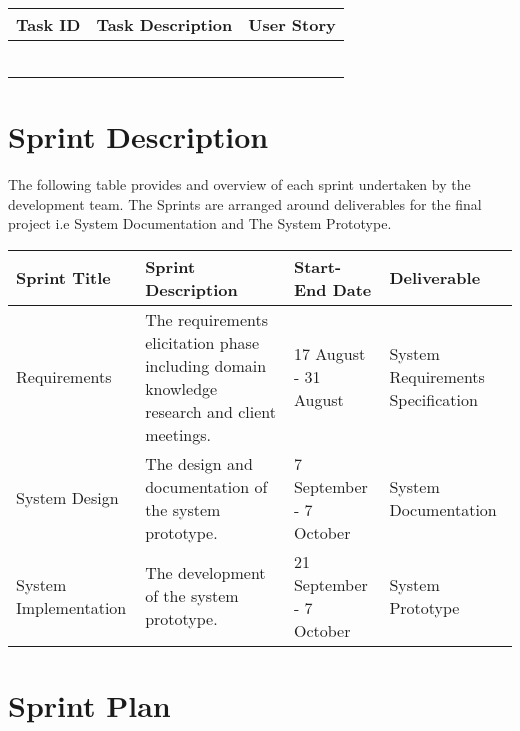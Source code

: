 \documentclass[11pt]{article}
\begin{document}
\begin{table}[H]
	\begin{tabular}{@{}|l|l|l|@{}}
		\toprule
		Task ID & Task Description & User Story \\ \midrule
				&           &     \\ \midrule
				&           &     \\ \midrule
				&           &     \\ \midrule
				&           &     \\ \midrule
				&           &     \\ \midrule
		
				&           &     \\ \bottomrule
	\end{tabular}
\end{table}

\section{Sprint Description}
The following table provides and overview of each sprint undertaken by the development team. The Sprints are arranged around deliverables for the final project i.e System Documentation and The System Prototype.
\begin{table}[H]
	\hskip-4.0cm\begin{tabular}[\textwidth]{@{}|l|l|l|l|@{}}
		\toprule
		Sprint Title & Sprint Description & Start-End Date & Deliverable \\ \midrule
		Requirements & \begin{minipage}{0.3\textwidth}
		The requirements elicitation phase including domain knowledge research and client meetings.
		\end{minipage} & 17 August - 31 August & System Requirements Specification \\ \midrule
	System Design	&  \begin{minipage}{0.3\textwidth}
		The design and documentation of the system prototype.
	\end{minipage} & 7 September - 7 October & System Documentation\\ \midrule
	System Implementation  &\begin{minipage}{0.3\textwidth}
		The development of the system prototype.
	\end{minipage}  & 21 September - 7 October & System Prototype\\ \bottomrule
	\end{tabular}
\end{table}

\section{Sprint Plan}
\end{document}
